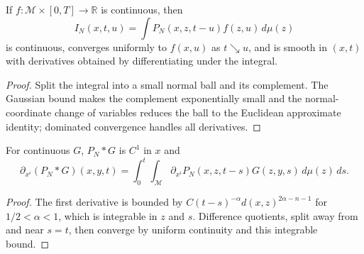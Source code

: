 \begin{lemma}
\label{lem:chow-iii-ch23-parametrix-integration-continuity}


If $f:\mathcal M\times[0,T]\to\mathbb R$ is continuous, then
\[
I_N(x,t,u)=\int P_N(x,z,t-u)f(z,u)\,d\mu(z)
\]
is continuous, converges uniformly to $f(x,u)$ as $t\searrow u$, and is smooth
in $(x,t)$ with derivatives obtained by differentiating under the integral.
\end{lemma}
\begin{proof}
\sketch Split the integral into a small normal ball and its complement.  The Gaussian
bound makes the complement exponentially small and the normal-coordinate change
of variables reduces the ball to the Euclidean approximate identity; dominated
convergence handles all derivatives.
\end{proof}

\begin{lemma}
\label{lem:chow-iii-ch23-first-convolution-derivative}


For continuous $G$, $P_N*G$ is $C^1$ in $x$ and
\[
\partial_{x^i}(P_N*G)(x,y,t)=\int_0^t\int_{\mathcal M}
\partial_{x^i}P_N(x,z,t-s)G(z,y,s)\,d\mu(z)\,ds.
\]
\end{lemma}
\begin{proof}
\sketch The first derivative is bounded by
\(C(t-s)^{-\alpha}d(x,z)^{2\alpha-n-1}\) for $1/2<\alpha<1$,
which is integrable in $z$ and $s$.  Difference quotients, split away from and
near $s=t$, then converge by uniform continuity and this integrable bound.
\end{proof}

